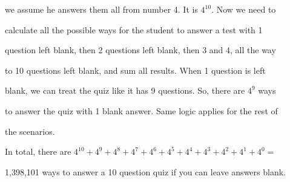 \documentclass[10pt]{article}
\begin{document}
we assume he answers them all from number 4. It is $4^{10}$. Now we need to

calculate all the possible ways for the student to answer a test with 1 

question left blank, then 2 questions left blank, then 3 and 4, all the way

to 10 questions left blank, and sum all results. When 1 question is left 

blank, we can treat the quiz like it has 9 questions. So, there are $4^9$ ways

to answer the quiz with 1 blank answer. Same logic applies for the rest of 

the scenarios. 

In total, there are $4^{10}+4^9+4^8+4^7+4^6+4^5+4^4+4^3+4^2+4^1+4^0=$

1,398,101 ways to answer a 10 question quiz if you can leave answers blank. 
\end{document}
